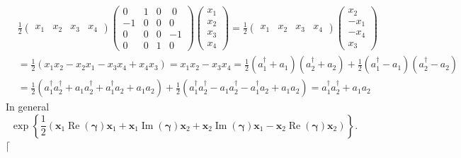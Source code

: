 \documentclass[aps, preprint]{revtex4}
\begin{document}
\begin{align} & \frac{1}{2} \left (\begin{array}{cccc}x_{1} & x_{2} & x_{3} & x_{4}\end{array}\right ) \left (\begin{array}{cccc}0 & 1 & 0 & \;0 \\
 -1 & 0 & 0 & 0 \\
0 & 0 & 0 &  -1 \\
0 & 0 & 1 & 0\end{array}\right ) \left (\begin{array}{c}x_{1} \\
x_{2} \\
x_{3} \\
x_{4}\end{array}\right ) =\frac{1}{2} \left (\begin{array}{cccc}x_{1} & x_{2} & x_{3} & x_{4}\end{array}\right ) \left (\begin{array}{c}x_{2} \\
 -x_{1} \\
 -x_{4} \\
x_{3}\end{array}\right ) \\
 &  =\frac{1}{2} \left (x_{1} x_{2} -x_{2} x_{1} -x_{3} x_{4} +x_{4} x_{3}\right ) =x_{1} x_{2} -x_{3} x_{4} =\frac{1}{2} \left (a_{1}^{ \dag } +a_{1}\right ) \left (a_{2}^{ \dag } +a_{2}\right ) +\frac{1}{2} \left (a_{1}^{ \dag } -a_{1}\right ) \left (a_{2}^{ \dag } -a_{2}\right ) \\
 &  =\frac{1}{2} \left (a_{1}^{ \dag } a_{2}^{ \dag } +a_{1} a_{2}^{ \dag } +a_{1}^{ \dag } a_{2} +a_{1} a_{2}\right ) +\frac{1}{2} \left (a_{1}^{ \dag } a_{2}^{ \dag } -a_{1} a_{2}^{ \dag } -a_{1}^{ \dag } a_{2} +a_{1} a_{2}\right ) =a_{1}^{ \dag } a_{2}^{ \dag } +a_{1} a_{2}\end{align}In general
\begin{equation}\exp  \left \{\frac{1}{2} \left (\mathbf{x}_{1} \ensuremath{\operatorname*{Re}} \left (\mathbf{\gamma }\right ) \mathbf{x}_{1} +\mathbf{x}_{1} \ensuremath{\operatorname*{Im}} \left (\mathbf{\gamma }\right ) \mathbf{x}_{2} +\mathbf{x}_{2} \ensuremath{\operatorname*{Im}} \left (\mathbf{\gamma }\right ) \mathbf{x}_{1} -\mathbf{x}_{2} \ensuremath{\operatorname*{Re}} \left (\mathbf{\gamma }\right ) \mathbf{x}_{2}\right )\right \}\text{.}
\end{equation}$\lceil $
\end{document}
